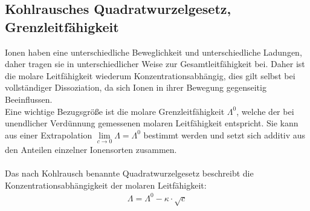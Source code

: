 \documentclass[12pt,a4paper,titlepage,headinclude,bibtotoc]{scrartcl}
\begin{document}
\subsection{Kohlrausches Quadratwurzelgesetz, Grenzleitfähigkeit}
Ionen haben eine unterschiedliche Beweglichkeit und unterschiedliche Ladungen, daher tragen sie in unterschiedlicher Weise zur Gesamtleitfähigkeit bei. Daher ist die molare Leitfähigkeit wiederum Konzentrationsabhängig, dies gilt selbst bei vollständiger Dissoziation, da sich Ionen in ihrer Bewegung gegenseitig Beeinflussen.\\
Eine wichtige Bezugsgröße ist die molare Grenzleitfähigkeit $\Lambda^0$, welche der bei unendlicher Verdünnung gemessenen molaren Leitfähigkeit entspricht. Sie kann aus einer Extrapolation $ \lim \limits_{c \rightarrow 0 } \Lambda = \Lambda ^0$ bestimmt werden und setzt sich additiv aus den Anteilen einzelner Ionensorten zusammen.\\\\
Das nach Kohlrausch benannte Quadratwurzelgesetz beschreibt die Konzentrationsabhängigkeit der molaren Leitfähigkeit:
\begin{align}
\Lambda = \Lambda ^0 - \kappa \cdot \sqrt{c}
\end{align}
\end{document}
